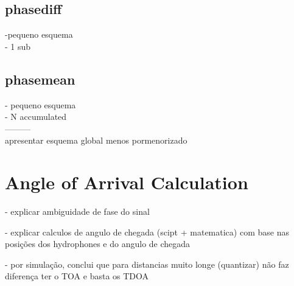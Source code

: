 \subsection{phasediff}
-pequeno esquema 
\\
- 1 sub

\subsection{phasemean}
- pequeno esquema
\\
- N accumulated
\\
---------
\\
apresentar esquema global menos pormenorizado

\section{Angle of Arrival Calculation}

- explicar ambiguidade de fase do sinal

- explicar calculos de angulo de chegada (scipt + matematica) com base nas posições dos hydrophones e do angulo de chegada

- por simulação, conclui que para distancias muito longe (quantizar) não faz diferença ter o TOA e basta os TDOA

